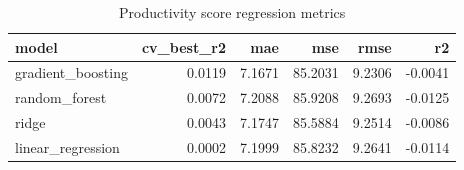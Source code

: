 \begin{table}
\caption{Productivity score regression metrics}
\label{tab:regression-productivity-metrics}
\begin{tabular}{lrrrrr}
\toprule
model & cv\_best\_r2 & mae & mse & rmse & r2 \\
\midrule
gradient\_boosting & 0.0119 & 7.1671 & 85.2031 & 9.2306 & -0.0041 \\
random\_forest & 0.0072 & 7.2088 & 85.9208 & 9.2693 & -0.0125 \\
ridge & 0.0043 & 7.1747 & 85.5884 & 9.2514 & -0.0086 \\
linear\_regression & 0.0002 & 7.1999 & 85.8232 & 9.2641 & -0.0114 \\
\bottomrule
\end{tabular}
\end{table}
